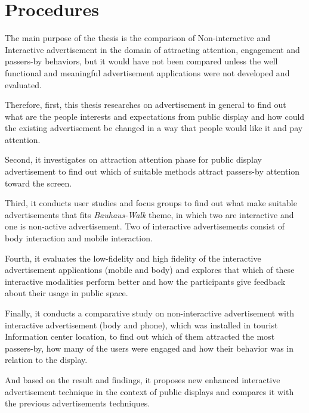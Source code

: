 \section{Procedures}

The main purpose of the thesis is the comparison of Non-interactive and Interactive advertisement in the domain of attracting attention, engagement and passers-by behaviors, but it would have not been compared unless the well functional and meaningful advertisement applications were not developed and evaluated. 

Therefore, first, this thesis researches on advertisement in general to find out what are the people interests and expectations from public display and how could the existing advertisement be changed in a way that people would like it and pay attention.

Second, it investigates on attraction attention phase for public display advertisement to find out which of suitable methods attract passers-by attention toward the screen.

Third, it conducts user studies and focus groups to find out what make suitable advertisements that fits \emph{Bauhaus-Walk} theme, in which two are interactive and one is non-active advertisement. Two of interactive advertisements consist of body interaction and mobile interaction.

Fourth, it evaluates the low-fidelity and high fidelity of the interactive advertisement applications (mobile and body) and explores that which of these interactive modalities perform better and how the participants give feedback about their usage in public space.

Finally, it conducts a comparative study on non-interactive advertisement with interactive advertisement (body and phone), which was installed in tourist Information center location, to find out which of them attracted the most passers-by, how many of the users were engaged and how their behavior was in relation to the display.

And based on the result and findings, it proposes new enhanced interactive advertisement technique in the context of public displays and compares it with the previous advertisements techniques.



